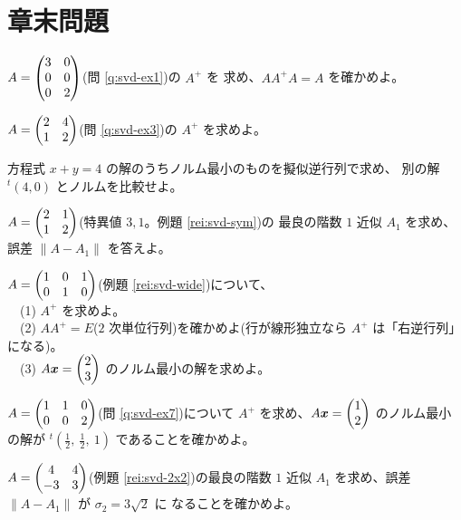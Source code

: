 \section*{章末問題}

\begin{mondai}[基本]\label{q:pinv-ex1}
$A = \begin{pmatrix}3 & 0 \\ 0 & 0 \\ 0 & 2\end{pmatrix}$(問 \ref{q:svd-ex1})の $A^{+}$ を
求め、$AA^{+}A = A$ を確かめよ。
\end{mondai}

\begin{mondai}[基本]\label{q:pinv-ex2}
$A = \begin{pmatrix}2 & 4 \\ 1 & 2\end{pmatrix}$(問 \ref{q:svd-ex3})の $A^{+}$ を求めよ。
\end{mondai}

\begin{mondai}[基本]\label{q:pinv-ex3}
方程式 $x + y = 4$ の解のうちノルム最小のものを擬似逆行列で求め、
別の解 ${}^t(4, 0)$ とノルムを比較せよ。
\end{mondai}

\begin{mondai}[基本]\label{q:pinv-ex4}
$A = \begin{pmatrix}2 & 1 \\ 1 & 2\end{pmatrix}$(特異値 $3, 1$。例題 \ref{rei:svd-sym})の
最良の階数 $1$ 近似 $A_1$ を求め、誤差 $\|A - A_1\|$ を答えよ。
\end{mondai}

\begin{mondai}[標準]\label{q:pinv-ex5}
$A = \begin{pmatrix}1 & 0 & 1 \\ 0 & 1 & 0\end{pmatrix}$(例題 \ref{rei:svd-wide})について、\\
　(1) $A^{+}$ を求めよ。\\
　(2) $AA^{+} = E$($2$ 次単位行列)を確かめよ(行が線形独立なら
$A^{+}$ は「右逆行列」になる)。\\
　(3) $A\bm{x} = \begin{pmatrix}2 \\ 3\end{pmatrix}$ のノルム最小の解を求めよ。
\end{mondai}

\begin{mondai}[標準]\label{q:pinv-ex6}
$A = \begin{pmatrix}1 & 1 & 0 \\ 0 & 0 & 2\end{pmatrix}$(問 \ref{q:svd-ex7})について
$A^{+}$ を求め、$A\bm{x} = \begin{pmatrix}1 \\ 2\end{pmatrix}$ のノルム最小の解が
${}^t\!\left(\frac{1}{2},\ \frac{1}{2},\ 1\right)$ であることを確かめよ。
\end{mondai}

\begin{mondai}[標準]\label{q:pinv-ex7}
$A = \begin{pmatrix}4 & 4 \\ -3 & 3\end{pmatrix}$(例題 \ref{rei:svd-2x2})の最良の階数 $1$
近似 $A_1$ を求め、誤差 $\|A - A_1\|$ が $\sigma_2 = 3\sqrt{2}$ に
なることを確かめよ。
\end{mondai}


